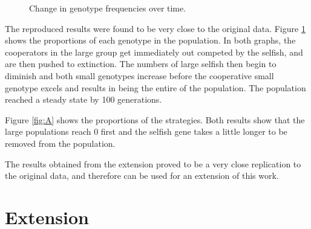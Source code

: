 \documentclass[11pt]{ecsarticle}
\begin{document}
\begin{figure}
\centering     %
{}
\caption{Change in genotype frequencies over time.}\label{fig:B}
\end{figure}

The reproduced results were found to be very close to the original data. 
Figure \ref{fig:B} shows the proportions of each genotype in the population.
In both graphs, the cooperators in the large group get immediately out competed by the selfish, and are then pushed to extinction.
The numbers of large selfish then begin to diminish and both small genotypes increase before the cooperative small genotype excels and results in being the entire of the population.
The population reached a steady state by 100 generations.

Figure \ref{fig:A} shows the proportions of the strategies. 
Both results show that the large populations reach 0 first and the selfish gene takes a little longer to be removed from the population.

The results obtained from the extension proved to be a very close replication to the original data, and therefore can be used for an extension of this work.

\section{Extension}\label{sc:extension}
\end{document}
